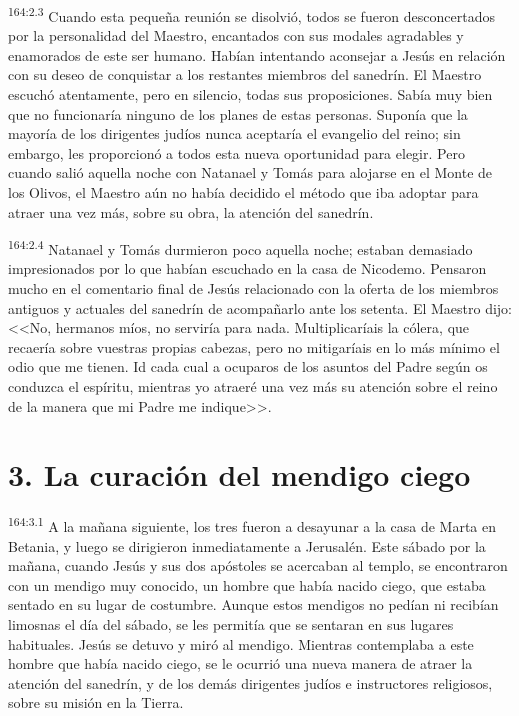 \par 
\textsuperscript{164:2.3} Cuando esta pequeña reunión se disolvió, todos se fueron desconcertados por la personalidad del Maestro, encantados con sus modales agradables y enamorados de este ser humano. Habían intentando aconsejar a Jesús en relación con su deseo de conquistar a los restantes miembros del sanedrín. El Maestro escuchó atentamente, pero en silencio, todas sus proposiciones. Sabía muy bien que no funcionaría ninguno de los planes de estas personas. Suponía que la mayoría de los dirigentes judíos nunca aceptaría el evangelio del reino; sin embargo, les proporcionó a todos esta nueva oportunidad para elegir. Pero cuando salió aquella noche con Natanael y Tomás para alojarse en el Monte de los Olivos, el Maestro aún no había decidido el método que iba adoptar para atraer una vez más, sobre su obra, la atención del sanedrín.

\par 
\textsuperscript{164:2.4} Natanael y Tomás durmieron poco aquella noche; estaban demasiado impresionados por lo que habían escuchado en la casa de Nicodemo. Pensaron mucho en el comentario final de Jesús relacionado con la oferta de los miembros antiguos y actuales del sanedrín de acompañarlo ante los setenta. El Maestro dijo: <<No, hermanos míos, no serviría para nada. Multiplicaríais la cólera, que recaería sobre vuestras propias cabezas, pero no mitigaríais en lo más mínimo el odio que me tienen. Id cada cual a ocuparos de los asuntos del Padre según os conduzca el espíritu, mientras yo atraeré una vez más su atención sobre el reino de la manera que mi Padre me indique>>.

\section*{3. La curación del mendigo ciego}
\par 
\textsuperscript{164:3.1} A la mañana siguiente, los tres fueron a desayunar a la casa de Marta en Betania, y luego se dirigieron inmediatamente a Jerusalén. Este sábado por la mañana, cuando Jesús y sus dos apóstoles se acercaban al templo, se encontraron con un mendigo muy conocido, un hombre que había nacido ciego, que estaba sentado en su lugar de costumbre. Aunque estos mendigos no pedían ni recibían limosnas el día del sábado, se les permitía que se sentaran en sus lugares habituales. Jesús se detuvo y miró al mendigo. Mientras contemplaba a este hombre que había nacido ciego, se le ocurrió una nueva manera de atraer la atención del sanedrín, y de los demás dirigentes judíos e instructores religiosos, sobre su misión en la Tierra.

